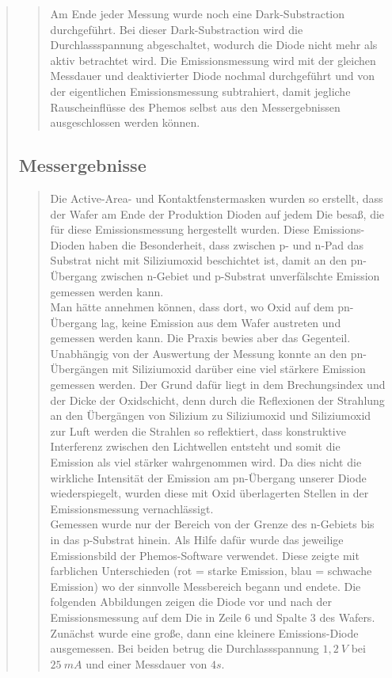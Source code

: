 \begin{quote}
\begin{quote}
        \vspace{1em}

        Am Ende jeder Messung wurde noch eine Dark-Substraction durchgeführt.
        Bei dieser Dark-Substraction wird die Durchlassspannung abgeschaltet,
        wodurch die Diode nicht mehr als aktiv betrachtet wird. Die Emissionsmessung wird mit der
        gleichen Messdauer und deaktivierter Diode nochmal durchgeführt und von
        der eigentlichen Emissionsmessung subtrahiert, damit jegliche
        Rauscheinflüsse des Phemos selbst aus den Messergebnissen ausgeschlossen
        werden können.

        \end{quote}

        \subsection{Messergebnisse}
        \begin{quote}

        Die Active-Area- und Kontaktfenstermasken wurden so erstellt, dass der
        Wafer am Ende der Produktion Dioden auf jedem Die besaß, die für diese
        Emissionsmessung hergestellt wurden. Diese Emissions-Dioden haben die
        Besonderheit, dass zwischen p- und n-Pad das Substrat nicht mit Siliziumoxid beschichtet
        ist, damit an den pn-Übergang zwischen n-Gebiet und p-Substrat
        unverfälschte Emission gemessen werden kann.\\
        Man hätte annehmen können, dass dort, wo Oxid auf dem pn-Übergang lag,
        keine Emission aus dem Wafer austreten und gemessen werden kann. Die Praxis bewies aber das
        Gegenteil. Unabhängig von der Auswertung der Messung
        konnte an den pn-Übergängen mit Siliziumoxid darüber eine viel stärkere
        Emission gemessen werden. Der Grund dafür liegt in dem Brechungsindex
        und der Dicke der Oxidschicht, denn durch die Reflexionen der Strahlung an
        den Übergängen von Silizium zu Siliziumoxid und Siliziumoxid zur Luft
        werden die Strahlen so reflektiert, dass konstruktive Interferenz
        zwischen den Lichtwellen entsteht und somit die Emission als viel
        stärker wahrgenommen wird. Da dies nicht die wirkliche Intensität der
        Emission am pn-Übergang unserer Diode wiederspiegelt, wurden diese mit
        Oxid überlagerten Stellen in der Emissionsmessung vernachlässigt.\\

        Gemessen wurde nur der Bereich von der Grenze des n-Gebiets bis in
        das p-Substrat hinein. Als Hilfe dafür wurde das jeweilige Emissionsbild
        der Phemos-Software verwendet. Diese zeigte mit farblichen Unterschieden
        (rot = starke Emission, blau = schwache Emission) wo der sinnvolle
        Messbereich begann und endete. Die folgenden Abbildungen zeigen die
        Diode vor und nach der Emissionsmessung auf dem Die in Zeile $6$ und
        Spalte $3$ des Wafers. Zunächst wurde eine große, dann eine kleinere
        Emissions-Diode ausgemessen. Bei beiden betrug die Durchlassspannung
        $1,2\ V$ bei $25\ mA$ und einer Messdauer von $4s$.


\end{quote}
\end{quote}
